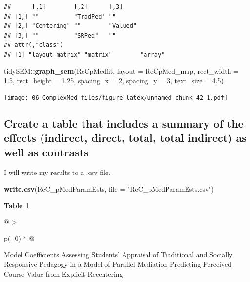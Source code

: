 \documentclass[
  11pt,
]{book}
\newenvironment{Shaded}{\begin{snugshade}}{\end{snugshade}}
\newcommand{\AttributeTok}[1]{\textcolor[rgb]{0.27,0.27,0.27}{#1}}
\newcommand{\DecValTok}[1]{\textcolor[rgb]{0.06,0.06,0.06}{#1}}
\newcommand{\FloatTok}[1]{\textcolor[rgb]{0.06,0.06,0.06}{#1}}
\newcommand{\FunctionTok}[1]{\textcolor[rgb]{0.27,0.27,0.27}{\textbf{#1}}}
\newcommand{\NormalTok}[1]{#1}
\newcommand{\SpecialCharTok}[1]{\textcolor[rgb]{0.43,0.43,0.43}{\textbf{#1}}}
\newcommand{\StringTok}[1]{\textcolor[rgb]{0.5,0.5,0.5}{#1}}
\begin{document}
\begin{verbatim}
##      [,1]        [,2]      [,3]    
## [1,] ""          "TradPed" ""      
## [2,] "Centering" ""        "Valued"
## [3,] ""          "SRPed"   ""      
## attr(,"class")
## [1] "layout_matrix" "matrix"        "array"
\end{verbatim}

\begin{Shaded}
\begin{Highlighting}[]
\NormalTok{tidySEM}\SpecialCharTok{::}\FunctionTok{graph\_sem}\NormalTok{(ReCpMedfit, }\AttributeTok{layout =}\NormalTok{ ReCpMed\_map, }\AttributeTok{rect\_width =} \FloatTok{1.5}\NormalTok{,}
    \AttributeTok{rect\_height =} \FloatTok{1.25}\NormalTok{, }\AttributeTok{spacing\_x =} \DecValTok{2}\NormalTok{, }\AttributeTok{spacing\_y =} \DecValTok{3}\NormalTok{, }\AttributeTok{text\_size =} \FloatTok{4.5}\NormalTok{)}
\end{Highlighting}
\end{Shaded}

\texttt{[image: 06-ComplexMed\_files/figure-latex/unnamed-chunk-42-1.pdf]}

\hypertarget{create-a-table-that-includes-a-summary-of-the-effects-indirect-direct-total-total-indirect-as-well-as-contrasts}{%
\subsection*{Create a table that includes a summary of the effects (indirect, direct, total, total indirect) as well as contrasts}\label{create-a-table-that-includes-a-summary-of-the-effects-indirect-direct-total-total-indirect-as-well-as-contrasts}}


I will write my results to a .csv file.

\begin{Shaded}
\begin{Highlighting}[]
\FunctionTok{write.csv}\NormalTok{(ReC\_pMedParamEsts, }\AttributeTok{file =} \StringTok{"ReC\_pMedParamEsts.csv"}\NormalTok{)}
\end{Highlighting}
\end{Shaded}

\textbf{Table 1}

\begin{longtable}[]{@{}
  >{\raggedright\arraybackslash}p{(\columnwidth - 0\tabcolsep) * }@{}}
\toprule\noalign{}
\begin{minipage}[b]{\linewidth}\raggedright
Model Coefficients Assessing Students' Appraisal of Traditional and Socially Responsive Pedagogy in a Model of Parallel Mediation Predicting Perceived Course Value from Explicit Recentering
\end{minipage} \\
\midrule\noalign{}
\endhead
\bottomrule\noalign{}
\endlastfoot
\end{longtable}
\end{document}

